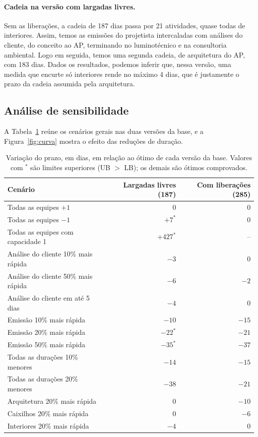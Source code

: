 \paragraph{Cadeia na versão com largadas livres.}
Sem as liberações, a cadeia de 187 dias passa por 21 atividades, quase
todas de interiores. Assim, temos as emissões do projetista intercaladas com análises do
cliente, do conceito ao AP, terminando no luminotécnico e na consultoria
ambiental. Logo em seguida, temos uma segunda cadeia, de arquitetura do AP, com
183 dias. Dados os resultados, podemos inferir que, nessa versão, uma medida que encurte só interiores
rende no máximo 4 dias, que é justamente o prazo da cadeia assumida pela arquitetura.

\subsection{Análise de sensibilidade}
\label{sec:sensibilidade}

A Tabela~\ref{tab:sensibilidade} reúne os cenários gerais nas duas versões
da base, e a Figura~\ref{fig:curva} mostra o efeito das reduções de
duração.

\begin{table}[htbp]
  \centering
  \caption{Variação do prazo, em dias, em relação ao ótimo de cada versão
  da base. Valores com $^{*}$ são limites superiores (UB $>$ LB); os demais
  são ótimos comprovados.}
  \label{tab:sensibilidade}
  \small
  \begin{tabular}{lrr}
    \toprule
    Cenário & Largadas livres (187) & Com liberações (285) \\
    \midrule
    Todas as equipes $+1$                  &   0       &   0 \\
    Todas as equipes $-1$                  & $+7^{*}$  &   0 \\
    Todas as equipes com capacidade 1      & $+427^{*}$ & -- \\
    \midrule
    Análise do cliente 10\% mais rápida    &  $-3$     &   0 \\
    Análise do cliente 50\% mais rápida    &  $-6$     &  $-2$ \\
    Análise do cliente em até 5 dias       &  $-4$     &   0 \\
    \midrule
    Emissão 10\% mais rápida               & $-10$     & $-15$ \\
    Emissão 20\% mais rápida               & $-22^{*}$ & $-21$ \\
    Emissão 50\% mais rápida               & $-35^{*}$ & $-37$ \\
    \midrule
    Todas as durações 10\% menores         & $-14$     & $-15$ \\
    Todas as durações 20\% menores         & $-38$     & $-21$ \\
    \midrule
    Arquitetura 20\% mais rápida           &   0       & $-10$ \\
    Caixilhos 20\% mais rápida             &   0       &  $-6$ \\
    Interiores 20\% mais rápida            &  $-4$     &   0 \\
    \bottomrule
  \end{tabular}
\end{table}

